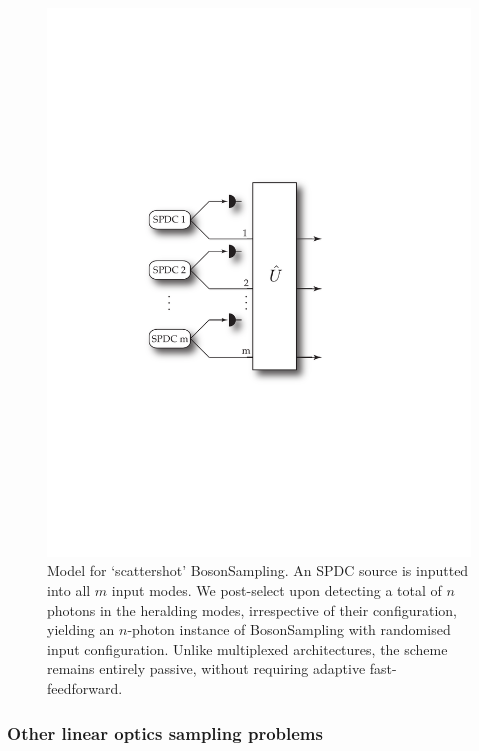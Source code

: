 \documentclass[aps,rmp,twocolumn,amsmath,amssymb,nofootinbib,superscriptaddress,longbibliography,floatfix,table-of-contents,eqsecnum]{revtex4-1}
\begin{document}
\begin{figure}[!htb]
\includegraphics[width=0.7\columnwidth]{scattershot_model}
\caption{Model for `scattershot' {\sc BosonSampling}. An SPDC source is inputted into all $m$ input modes. We post-select upon detecting a total of $n$ photons in the heralding modes, irrespective of their configuration, yielding an $n$-photon instance of {\sc BosonSampling} with randomised input configuration. Unlike multiplexed architectures, the scheme remains entirely passive, without requiring adaptive fast-feedforward.} \label{fig:scattershot_model}
\end{figure}

%
%

\subsubsection{Other linear optics sampling problems} \label{sec:other_LO_samp_probs} 
\end{document}
